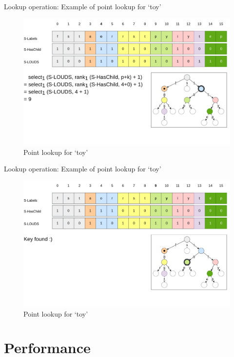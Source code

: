 \documentclass{beamer}
\begin{document}
\begin{frame}{Lookup operation: Example of point lookup for `toy'}
		\begin{figure}
				\centering
				\includegraphics[width=\textwidth]{resources/surf_point_lookup_2}
				\caption{Point lookup for `toy'}
		\end{figure}
\end{frame}

\begin{frame}{Lookup operation: Example of point lookup for `toy'}
		\begin{figure}
				\centering
				\includegraphics[width=\textwidth]{resources/surf_point_lookup_3}
				\caption{Point lookup for `toy'}
		\end{figure}
\end{frame}

\section{Performance}
\end{document}
